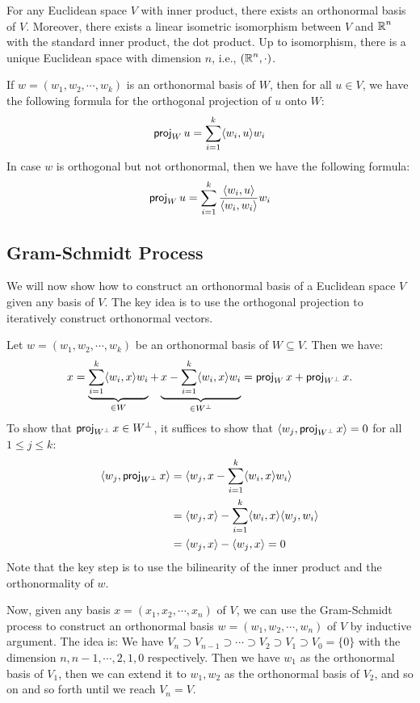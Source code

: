\begin{proposition}
	For any Euclidean space $V$ with inner product, there exists an orthonormal basis of $V$. Moreover, there exists a linear isometric isomorphism between $V$ and $\operatorname{\mathbb{R}}^n$ with the standard inner product, the dot product. Up to isomorphism, there is a unique Euclidean space with dimension $n$, i.e., $(\operatorname{\mathbb{R}}^n, \cdot)$.
\end{proposition}

If $w = (w_1, w_2, \cdots, w_k)$ is an orthonormal basis of $W$, then for all $u \in V$, we have the following formula for the orthogonal projection of $u$ onto $W$:
\[
	\operatorname{\text{\normalfont\sffamily proj}}_W u = \sum_{i = 1}^k \langle w_i, u \rangle w_i
\]
In case $w$ is orthogonal but not orthonormal, then we have the following formula:
\[
	\operatorname{\text{\normalfont\sffamily proj}}_W u = \sum_{i = 1}^k \frac{\langle w_i, u \rangle}{\langle w_i, w_i \rangle} w_i
\]

\subsection{Gram-Schmidt Process}
We will now show how to construct an orthonormal basis of a Euclidean space $V$ given any basis of $V$. The key idea is to use the orthogonal projection to iteratively construct orthonormal vectors.

Let $w = (w_1, w_2, \cdots, w_k)$ be an orthonormal basis of $W \subseteq V$. Then we have:
\[
	x = \underbrace{\sum_{i = 1}^k \langle w_i, x \rangle w_i}_{\in W} + \underbrace{x - \sum_{i = 1}^k \langle w_i, x \rangle w_i}_{\in W^\perp} = \operatorname{\text{\normalfont\sffamily proj}}_W x + \operatorname{\text{\normalfont\sffamily proj}}_{W^\perp} x.
\]
To show that $\operatorname{\text{\normalfont\sffamily proj}}_{W^\perp} x \in W^\perp$, it suffices to show that $\langle w_j, \operatorname{\text{\normalfont\sffamily proj}}_{W^\perp} x \rangle = 0$ for all $1 \leq j \leq k$:
\[
	\begin{split}
		\langle w_j, \operatorname{\text{\normalfont\sffamily proj}}_{W^\perp} x \rangle & = \langle w_j, x - \sum_{i = 1}^k \langle w_i, x \rangle w_i \rangle                      \\
		                                       & = \langle w_j, x \rangle - \sum_{i = 1}^k \langle w_i, x \rangle \langle w_j, w_i \rangle \\
		                                       & = \langle w_j, x \rangle - \langle w_j, x \rangle = 0
	\end{split}
\]
Note that the key step is to use the bilinearity of the inner product and the orthonormality of $w$.

Now, given any basis $x = (x_1, x_2, \cdots, x_n)$ of $V$, we can use the Gram-Schmidt process to construct an orthonormal basis $w = (w_1, w_2, \cdots, w_n)$ of $V$ by inductive argument. The idea is: We have $V_n \supset V_{n - 1} \supset \cdots \supset V_2 \supset V_1 \supset V_0 = \{ 0 \}$ with the dimension $n, n - 1, \cdots, 2, 1, 0$ respectively. Then we have $w_1$ as the orthonormal basis of $V_1$, then we can extend it to $w_1, w_2$ as the orthonormal basis of $V_2$, and so on and so forth until we reach $V_n = V$.

